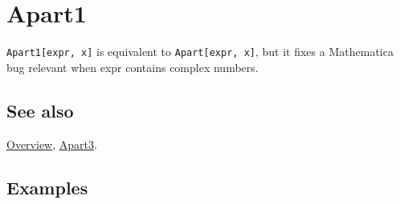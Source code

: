 \documentclass[../FeynCalcManual.tex]{subfiles}
\begin{document}
\hypertarget{apart1}{%
\section{Apart1}\label{apart1}}

\texttt{Apart1[\allowbreak{}expr,\ \allowbreak{}x]} is equivalent to
\texttt{Apart[\allowbreak{}expr,\ \allowbreak{}x]}, but it fixes a
Mathematica bug relevant when expr contains complex numbers.

\subsection{See also}

\hyperlink{toc}{Overview}, \hyperlink{apart3}{Apart3}.

\subsection{Examples}
\end{document}
